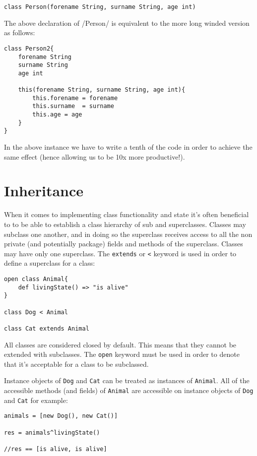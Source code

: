 \documentclass[conc-doc]{subfiles}
\begin{document}
\begin{lstlisting}
class Person(forename String, surname String, age int)
\end{lstlisting}

The above declaration of /Person/ is equivalent to the more long winded version as follows:
\begin{lstlisting}
class Person2{
	forename String
	surname String
	age int
	
	this(forename String, surname String, age int){
		this.forename = forename
		this.surname  = surname 
		this.age = age
	}
}
\end{lstlisting}

In the above instance we have to write a tenth of the code in order to achieve the same effect (hence allowing us to be 10x more productive!).

\section{Inheritance}
When it comes to implementing class functionality and state it's often beneficial to to be able to establish a class hierarchy of sub and superclasses. Classes may subclass one another, and in doing so the superclass receives access to all the non private (and potentially package) fields and methods of the superclass. Classes may have only one superclass. The \lstinline{extends} or \lstinline{<} keyword is used in order to define a superclass for a class:

\begin{lstlisting}
open class Animal{
	def livingState() => "is alive"
}

class Dog < Animal

class Cat extends Animal
\end{lstlisting}

All classes are considered closed by default. This means that they cannot be extended with subclasses. The \lstinline{open} keyword must be used in order to denote that it's acceptable for a class to be subclassed.

Instance objects of \lstinline{Dog} and \lstinline{Cat} can be treated as instances of \lstinline{Animal}. All of the accessible methods (and fields) of \lstinline{Animal} are accessible on instance objects of \lstinline{Dog} and \lstinline{Cat} for example:
\begin{lstlisting}
animals = [new Dog(), new Cat()]

res = animals^livingState()

//res == [is alive, is alive]
\end{lstlisting}
\end{document}

